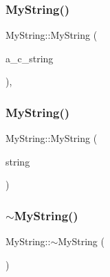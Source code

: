\mbox{\label{class_my_string_a28134eb91b6698f46b12accefa157d0f}} 
\subsubsection{\texorpdfstring{MyString()}{MyString()}\hspace{0.1cm}{\footnotesize\ttfamily [2/9]}}
{\footnotesize\ttfamily My\+String\+::\+My\+String (\begin{DoxyParamCaption}\item[{const char $\ast$}]{a\+\_\+c\+\_\+string }\end{DoxyParamCaption})\hspace{0.3cm}{\ttfamily [inline]}, {\ttfamily [explicit]}}

\mbox{\label{class_my_string_ae24c7cf89a58dd2287303df2ac054c66}} 
\subsubsection{\texorpdfstring{MyString()}{MyString()}\hspace{0.1cm}{\footnotesize\ttfamily [3/9]}}
{\footnotesize\ttfamily My\+String\+::\+My\+String (\begin{DoxyParamCaption}\item[{const \mbox{\hyperlink{class_my_string}{My\+String}} \&}]{string }\end{DoxyParamCaption})\hspace{0.3cm}{\ttfamily [inline]}}

\mbox{\label{class_my_string_a7bee4fe8ad82a0b7b8f65b02054b156b}} 
\subsubsection{\texorpdfstring{$\sim$MyString()}{~MyString()}\hspace{0.1cm}{\footnotesize\ttfamily [1/3]}}
{\footnotesize\ttfamily My\+String\+::$\sim$\+My\+String (\begin{DoxyParamCaption}{ }\end{DoxyParamCaption})\hspace{0.3cm}{\ttfamily [inline]}}

